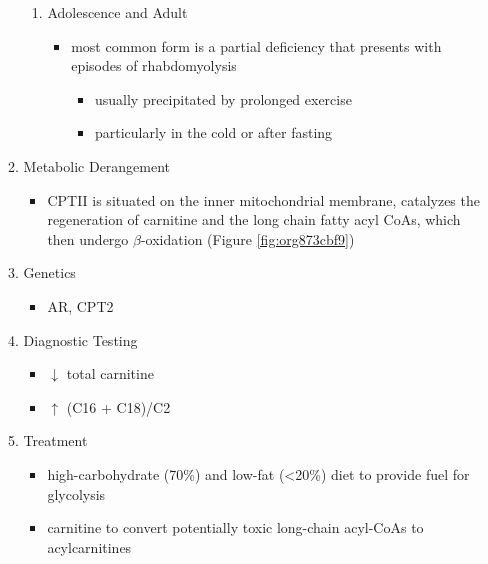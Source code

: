 \documentclass{scrartcl}
\begin{document}
\begin{enumerate}
\begin{enumerate}
\begin{enumerate}
\item Adolescence and Adult
\label{sec:org9e32eb3}
\begin{itemize}
\item most common form is a partial deficiency that presents with
episodes of rhabdomyolysis
\begin{itemize}
\item usually precipitated by prolonged exercise
\item particularly in the cold or after fasting
\end{itemize}
\end{itemize}
\end{enumerate}

\item Metabolic Derangement
\label{sec:org5c80ace}
\begin{itemize}
\item CPTII is situated on the inner mitochondrial membrane, catalyzes the
regeneration of carnitine and the long chain fatty acyl CoAs, which
then undergo \(\beta\)-oxidation (Figure \ref{fig:org873cbf9})
\end{itemize}
\item Genetics
\label{sec:org2402245}
\begin{itemize}
\item AR, CPT2
\end{itemize}
\item Diagnostic Testing
\label{sec:org4997f85}
\begin{itemize}
\item \(\downarrow\) total carnitine
\item \(\uparrow\) (C16 + C18)/C2
\end{itemize}

\item Treatment
\label{sec:org57c0689}
\begin{itemize}
\item high-carbohydrate (70\%) and low-fat (<20\%) diet to provide fuel for glycolysis
\item carnitine to convert potentially toxic long-chain acyl-CoAs to
acylcarnitines
\end{itemize}
\end{enumerate}
\end{enumerate}
\end{document}
